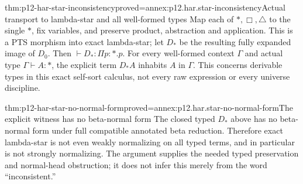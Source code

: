 \begin{hbtheorem}{thm:p12-har-star-inconsistency}{proved=annex:p12.har.star-inconsistency}{Actual transport to lambda-star and all well-formed types}
Map each of \(\ast,\Box,\triangle\) to the single \(\ast\),
fix variables, and preserve product, abstraction and application.
This is a PTS morphism into exact lambda-star; let \(D_\ast\)
be the resulting fully expanded image of \(D_0\). Then
\(\vdash D_\ast:\Pi p:\ast.p\).
For every well-formed context \(\Gamma\) and actual type
\(\Gamma\vdash A:\ast\), the explicit term
\(D_\ast A\) inhabits \(A\) in \(\Gamma\).
This concerns derivable types in this exact self-sort calculus, not every
raw expression or every universe discipline.
\end{hbtheorem}

\begin{hbtheorem}{thm:p12-har-star-no-normal-form}{proved=annex:p12.har.star-no-normal-form}{The explicit witness has no beta-normal form}
The closed typed \(D_\ast\) above has no beta-normal form under
full compatible annotated beta reduction. Therefore exact lambda-star
is not even weakly normalizing on all typed terms, and in particular
is not strongly normalizing. The argument supplies the needed typed
preservation and normal-head obstruction; it does not infer this merely
from the word ``inconsistent.''
\end{hbtheorem}
